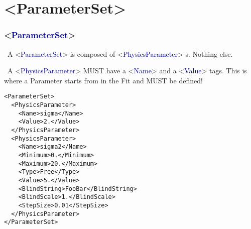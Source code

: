 \documentclass{beamer}
\begin{document}
\section{<ParameterSet>}
\begin{frame}[fragile]
\frametitle{<\textcolor{darkblue}{ParameterSet}>}
\scriptsize~A <\textcolor{darkblue}{ParameterSet}> is composed of <\textcolor{darkblue}{PhysicsParameter}>-s. Nothing else.\newline

\scriptsize~A <\textcolor{darkblue}{PhysicsParameter}> MUST have a <\textcolor{darkblue}{Name}> and a <\textcolor{darkblue}{Value}> tags.\newline
This is where a Parameter starts from in the Fit and MUST be defined!
\tiny
\begin{lstlisting}[tabsize=8]
<ParameterSet>
  <PhysicsParameter>
    <Name>sigma</Name>
    <Value>2.</Value>
  </PhysicsParameter>
  <PhysicsParameter>
    <Name>sigma2</Name>
    <Minimum>0.</Minimum>
    <Maximum>20.</Maximum>
    <Type>Free</Type>
    <Value>5.</Value>
    <BlindString>FooBar</BlindString>
    <BlindScale>1.</BlindScale>
    <StepSize>0.01</StepSize>
  </PhysicsParameter>
</ParameterSet>
\end{lstlisting}
\end{frame}
\end{document}
